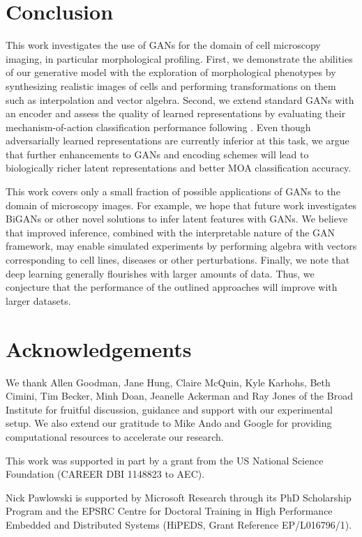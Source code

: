 \documentclass{article}
\begin{document}
\section{Conclusion}
This work investigates the use of GANs for the domain of cell microscopy imaging, in particular morphological profiling. First, we demonstrate the abilities of our generative model with the exploration of morphological phenotypes by synthesizing realistic images of cells and performing transformations on them such as interpolation and vector algebra. Second, we extend standard GANs with an encoder and assess the quality of learned representations by evaluating their mechanism-of-action classification performance following \cite{Ljosa2013}. Even though adversarially learned representations are currently inferior at this task, we argue that further enhancements to GANs and encoding schemes will lead to biologically richer latent representations and better MOA classification accuracy.

This work covers only a small fraction of possible applications of GANs to the domain of microscopy images. For example, we hope that future work investigates BiGANs\cite{donahue2016adversarial} or other novel solutions to infer latent features with GANs. We believe that improved inference, combined with the interpretable nature of the GAN framework, may enable simulated experiments by performing algebra with vectors corresponding to cell lines, diseases or other perturbations. Finally, we note that deep learning generally flourishes with larger amounts of data. Thus, we conjecture that the performance of the outlined approaches will improve with larger datasets.

\section*{Acknowledgements}
We thank Allen Goodman, Jane Hung, Claire McQuin, Kyle Karhohs, Beth Cimini, Tim Becker, Minh Doan, Jeanelle Ackerman and Ray Jones of the Broad Institute for fruitful discussion, guidance and support with our experimental setup. We also extend our gratitude to Mike Ando and Google for providing computational resources to accelerate our research.

This work was supported in part by a grant from the US National Science Foundation (CAREER DBI 1148823 to AEC).

Nick Pawlowski is supported by Microsoft Research through its PhD Scholarship Program and the EPSRC Centre for Doctoral Training in High Performance Embedded and Distributed Systems (HiPEDS, Grant Reference EP/L016796/1).



\end{document}
